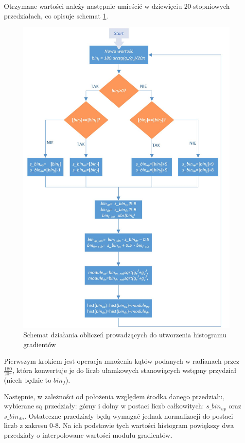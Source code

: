 Otrzymane wartości należy następnie umieścić w dziewięciu 20-stopniowych przedziałach, co opisuje schemat \ref{fig:hog_gradient}. 
\begin{figure}[!ht]
	\centering
	\includegraphics[width=12cm]{4_HOG_gradients.jpg}
	\caption{Schemat działania obliczeń prowadzących do utworzenia histogramu gradientów}
	\label{fig:hog_gradient}
\end{figure}
Pierwszym krokiem jest operacja mnożenia kątów podanych w radianach przez $\frac{180}{20\pi}$, która konwertuje je do liczb ułamkowych stanowiących wstępny przydział (niech będzie to $bin_f$).

Następnie, w zależności od położenia względem środka danego przedziału, wybierane są przedziały: górny i dolny w postaci liczb całkowitych: $s\_bin_{up}$ oraz $s\_bin_{dn}$. Ostateczne przedziały będą wymagać jednak normalizacji do postaci liczb z zakresu 0-8. Na ich podstawie tych wartości histogram powiększy dwa przedziały o interpolowane wartości modułu gradientów. 

